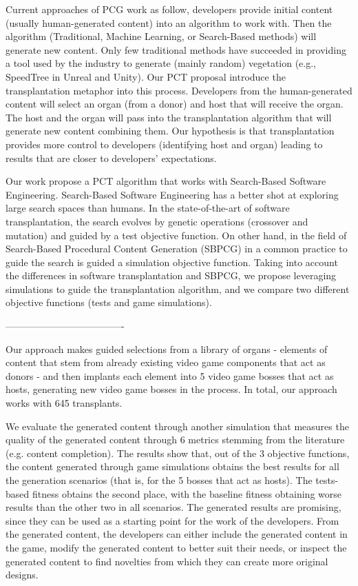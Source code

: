 Current approaches of PCG work as follow, developers provide initial content (usually human-generated content) into an algorithm to work with. Then the algorithm (Traditional, Machine Learning, or Search-Based methods) will generate new content. Only few traditional methods have succeeded in providing a tool used by the industry to generate (mainly random) vegetation (e.g., SpeedTree in Unreal and Unity).
Our PCT proposal introduce the transplantation metaphor into this process. Developers from the human-generated content will select an organ (from a donor) and host that will receive the organ. The host and the organ will pass into the transplantation algorithm that will generate new content combining them. Our hypothesis is that transplantation provides more control to developers (identifying host and organ) leading to results that are closer to developers’ expectations.

Our work propose a PCT algorithm that works with Search-Based Software Engineering.
Search-Based Software Engineering has a better shot at exploring large search spaces than humans. In the state-of-the-art of software transplantation, the search evolves by genetic operations (crossover and mutation) and guided by a test objective function. On other hand, in the field of Search-Based Procedural Content Generation (SBPCG) in a common practice to guide the search is guided a simulation objective function.
Taking into account the differences in software transplantation and SBPCG, we propose leveraging simulations to guide the transplantation algorithm, and we compare two different objective functions (tests and game simulations).

-------------------------------------

Our approach makes guided selections from a library of organs - elements of content that stem from already existing video game components that act as donors - and then implants each element into 5 video game bosses that act as hosts, generating new video game bosses in the process. In total, our approach works with 645 transplants. 

We evaluate the generated content through another simulation that measures the quality of the generated content through 6 metrics stemming from the literature~\cite{browne2010evolutionary} (e.g. content completion). The results show that, out of the 3 objective functions, the content generated through game simulations obtains the best results for all the generation scenarios (that is, for the 5 bosses that act as hosts). The tests-based fitness obtains the second place, with the baseline fitness obtaining worse results than the other two in all scenarios. The generated results are promising, since they can be used as a starting point for the work of the developers. From the generated content, the developers can either include the generated content in the game, modify the generated content to better suit their needs, or inspect the generated content to find novelties from which they can create more original designs. 

